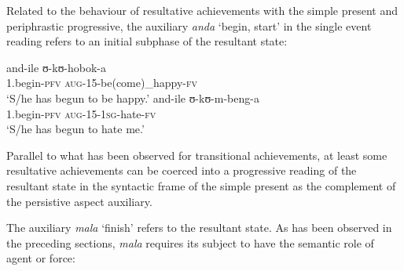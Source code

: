 Related to the behaviour of resultative achievements with the simple present and periphrastic progressive, the auxiliary \textit{anda} `begin, start' in the single event reading refers to an initial subphase of the resultant state:
\begin{exe}
\ex \begin{xlist}
\ex \gll and-ile ʊ-kʊ-hobok-a\\
1.begin-\textsc{pfv} \textsc{aug}-15-be(come)\_happy-\textsc{fv}\\
\glt `S/he has begun to be happy.'
\ex\gll and-ile ʊ-kʊ-m-beng-a\\
1.begin-\textsc{pfv} \textsc{aug}-15-\textsc{1sg}-hate-\textsc{fv}\\
\glt \lq S/he has begun to hate me.'
\end{xlist}
\end{exe}

Parallel to what has been observed for transitional achievements, at least some resultative achievements can be coerced into a progressive reading of the resultant state in the syntactic frame of the simple present as the complement of the persistive aspect auxiliary. 

\begin{exe}
\end{exe}

The auxiliary \textit{mala} \lq finish' refers to the resultant state. As has been observed in the preceding sections, \textit{mala} requires its subject to have the semantic role of agent or force:

